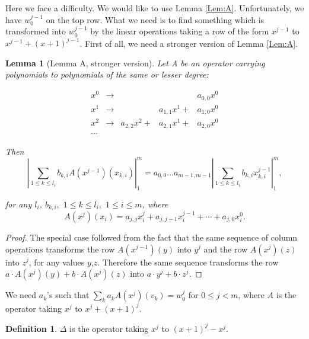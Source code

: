 \documentclass[10pt,reqno]{amsart}
\theoremstyle{plain}
\newtheorem{Lem}[Thm]{Lemma}
\theoremstyle{definition}
\newtheorem{Def}{Definition}
\theoremstyle{remark}
\def\determinant#1{\left|#1\right|}
\begin{document}
Here we face a difficulty. We would like to use Lemma \ref{Lem:A}. 
Unfortunately, we have $w_0^{j-1}$ on the top row. What we need is to 
find something which
is transformed into $w_0^{j-1}$ by the linear operations taking a row of
the form $x^{j-1}$ to $x^{j-1} + (x+1)^{j-1}$. First of all, we need a 
stronger version of Lemma \ref{Lem:A}.

\begin{Lem}[Lemma A, stronger version]
Let A be an operator carrying polynomials to
polynomials of the same or lesser degree:

\begin{equation}
\begin{matrix}
x^0 & \to & & & a_{0,0} x^0\\
x^1 & \to & & a_{1,1} x^1 + & a_{1,0} x^0\\
x^2 & \to & a_{2,2} x^2 + & a_{2,1} x^1 + & a_{2,0} x^0\\
\dotsb
\end{matrix}
\end{equation}

Then \begin{equation}
\determinant{\sum_{1\leq k\leq l_i} b_{k,i} A(x^{j-1})(x_{k,i})}_1^m 
= a_{0,0} ... a_{m-1,m-1} 
     \determinant{\sum_{1\leq k\leq l_i} b_{k,i} x_{k,i}^{j-1}}_1^m,
\end{equation}
                                                                         
for any $l_i$, $b_{k,i},$ $1\leq k\leq l_i,$ $1\leq i\leq m$, where 
\begin{equation}
A(x^j)(x_i) = 
      a_{j,j} x_i^j + a_{j,j-1} x_i^{j-1} + \dotsb + a_{j,0} x_i^0.
\end{equation}
\end{Lem}
\begin{proof}
The special case followed from the fact that
the same sequence of column operations transforms the row 
$A(x^{j-1})(y)$ into $y^j$
and the row $A(x^j)(z)$ into $z^j$, for any values $y$,$z$. Therefore the same
sequence transforms the row $a\cdot A(x^j)(y)+b\cdot A(x^j)(z)$ 
into $a\cdot y^j+b\cdot z^j$.
\end{proof}

We need $a_k$'s such that 
$\sum_k a_k A(x^j)(v_k) = w_0^j$ for $0\leq j<m$, 
where $A$ is the operator taking $x^j$ to $x^j + (x+1)^j$. 

\begin{Def}
$\Delta $ is the operator taking $x^j$ to $(x+1)^j-x^j$.
\end{Def}
\end{document}
